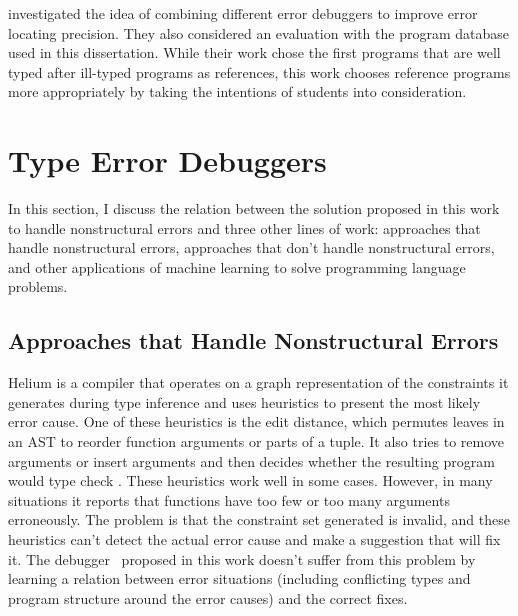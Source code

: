 \documentclass[12pt]{report}	%
\begin{document}
\cite{chen2014let} investigated the idea
of combining different error debuggers to improve
error locating precision. They also considered
an evaluation with the program database used
in this dissertation. While their work
chose the first programs that are well typed after
ill-typed programs as references, this work chooses
reference programs more appropriately by taking the
intentions of students into consideration.

\section{Type Error Debuggers}
\label{sec:reivew:debugger}

In this section, I discuss the relation between the solution proposed in this work to handle nonstructural errors and
three other lines of work: approaches that handle nonstructural errors, approaches that don't handle nonstructural errors,
and other applications of machine learning to solve programming language problems.

\subsection{Approaches that Handle Nonstructural Errors}

Helium \cite{Hage07:HTE} is a compiler that operates
on a graph representation of the constraints it generates
during type inference
and uses heuristics to present the most likely error cause. One
of these heuristics is the edit distance, which permutes leaves in
an AST to reorder function arguments or parts of a
tuple. It also tries to remove arguments or insert arguments and
then decides whether the resulting program would type check \cite{Heeren03:HLH}.
These heuristics work well in some cases. However, in many situations it
reports that functions have too few or too many arguments erroneously.
%
The problem is that the constraint
set generated is invalid, and these heuristics can't detect
the actual error cause and make a suggestion that will fix it.
%
The debugger \newCompiler\ proposed in this work doesn't suffer from this problem by learning
a relation between error situations (including conflicting types
and program structure around the error causes) and the correct fixes.
\end{document}
